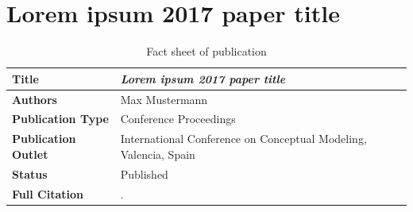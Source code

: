 \chapter{Lorem ipsum 2017 paper title}
\label{cha:PaperTwoThousandSeventeen}

\begin{table}[htpb]
\captionsetup{font=large,textfont=bf,justification=centering}	
\caption*{Fact sheet of publication }
\centering
\begin{tabular}{L{0.25\textwidth}p{0.65\textwidth}}
    \toprule
    \textbf{Title} & \emph{Lorem ipsum 2017 paper title} \\
    \midrule
    \textbf{Authors} & Max Mustermann \\
    \midrule
	\textbf{Publication Type}  & Conference Proceedings\\
	\midrule
	\textbf{Publication Outlet}  & International Conference on Conceptual Modeling, Valencia, Spain \\
	\midrule
	\textbf{Status} & Published \\
	\midrule
	\textbf{Full Citation} & . \\
    \bottomrule
\end{tabular}
\label{tab:pub:Paper2017Lorem}
\end{table}